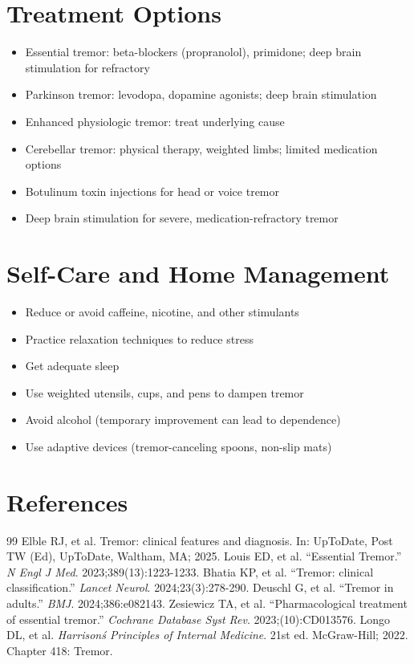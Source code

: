 \section*{Treatment Options}
\begin{itemize}
\item Essential tremor: beta-blockers (propranolol), primidone; deep brain stimulation for refractory
\item Parkinson tremor: levodopa, dopamine agonists; deep brain stimulation
\item Enhanced physiologic tremor: treat underlying cause
\item Cerebellar tremor: physical therapy, weighted limbs; limited medication options
\item Botulinum toxin injections for head or voice tremor
\item Deep brain stimulation for severe, medication-refractory tremor
\end{itemize}

\section*{Self-Care and Home Management}
\begin{itemize}
\item Reduce or avoid caffeine, nicotine, and other stimulants
\item Practice relaxation techniques to reduce stress
\item Get adequate sleep
\item Use weighted utensils, cups, and pens to dampen tremor
\item Avoid alcohol (temporary improvement can lead to dependence)
\item Use adaptive devices (tremor-canceling spoons, non-slip mats)
\end{itemize}

\section*{References}
\begin{thebibliography}{99}
 Elble RJ, et al. Tremor: clinical features and diagnosis. In: UpToDate, Post TW (Ed), UpToDate, Waltham, MA; 2025.
 Louis ED, et al. ``Essential Tremor.'' \emph{N Engl J Med}. 2023;389(13):1223-1233.
 Bhatia KP, et al. ``Tremor: clinical classification.'' \emph{Lancet Neurol}. 2024;23(3):278-290.
 Deuschl G, et al. ``Tremor in adults.'' \emph{BMJ}. 2024;386:e082143.
 Zesiewicz TA, et al. ``Pharmacological treatment of essential tremor.'' \emph{Cochrane Database Syst Rev}. 2023;(10):CD013576.
 Longo DL, et al. \emph{Harrison\'s Principles of Internal Medicine}. 21st ed. McGraw-Hill; 2022. Chapter 418: Tremor.
\end{thebibliography}
